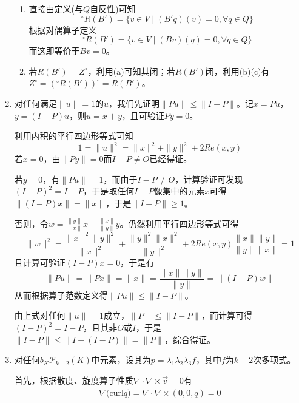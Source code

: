 \documentclass[a4paper,UTF8,fontset=windows,10pt]{ctexart}
\begin{document}
\begin{enumerate}
\begin{enumerate}
        \item 直接由定义(与$Q$自反性)可知
        $$^\circ R(B')=\{v\in V\mid (B'q)(v)=0,\forall q\in Q\}$$
        根据对偶算子定义
        $$^\circ R(B')=\{v\in V\mid (Bv)(q)=0,\forall q\in Q\}$$
        而这即等价于$Bv=0$。

        \item 若$R(B')=Z^\circ$，利用(a)可知其闭；若$R(B')$闭，利用(b)(c)有$Z^\circ=(^\circ R(B'))^\circ=R(B')$。
    \end{enumerate}

    \item
    对任何满足$\|u\|=1$的$u$，我们先证明$\|Pu\|\le\|I-P\|$。记$x=Pu$，$y=(I-P)u$，则$u=x+y$，且可验证$Py=0$。

    利用内积的平行四边形等式可知
    $$1=\|u\|^2=\|x\|^2+\|y\|^2+2Re(x,y)$$
    若$x=0$，由$\|Py\|=0$而$I-P\ne O$已经得证。
    
    若$y=0$，有$\|Pu\|=1$，而由于$I-P\ne O$，计算验证可发现$(I-P)^2=I-P$，于是取任何$I-P$像集中的元素$x$可得$\|(I-P)x\|=\|x\|$，于是$\|I-P\|\ge1$。

    否则，令$w=\frac{\|y\|}{\|x\|}x+\frac{\|x\|}{\|y\|}y$。仍然利用平行四边形等式可得
    $$\|w\|^2=\frac{\|x\|^2\|y\|^2}{\|x\|^2}+\frac{\|y\|^2\|x\|^2}{\|y\|^2}+2Re(x,y)\frac{\|x\|\|y\|}{\|y\|\|x\|}=1$$
    且计算可验证$(I-P)x=0$，于是有
    $$\|Pu\|=\|Px\|=\|x\|=\frac{\|x\|\|y\|}{\|y\|}=\|(I-P)w\|$$
    从而根据算子范数定义得$\|Pu\|\le\|I-P\|$。
    
    由上式对任何$\|u\|=1$成立，$\|P\|\le\|I-P\|$，而计算可得$(I-P)^2=I-P$，且其非$O$或$I$，于是$\|I-P\|\le\|I-(I-P)\|=\|P\|$，综合得证。

    \item 对任何$b_K\mathcal{P}_{k-2}(K)$中元素，设其为$p=\lambda_1\lambda_2\lambda_3f$，其中$f$为$k-2$次多项式。
    
    首先，根据散度、旋度算子性质$\nabla\cdot\nabla\times\vec{v}=0$有
    $$\nabla\dot(\mathrm{curl}q)=\nabla\cdot\nabla\times(0,0,q)=0$$


\end{enumerate}
\end{document}
